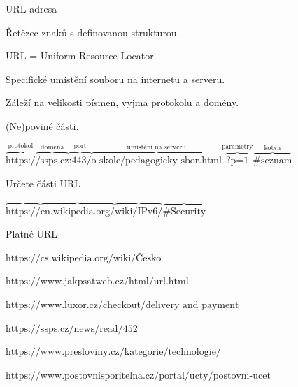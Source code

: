 \documentclass[aspectratio=169]{beamer}
\begin{document}
\begin{frame}{URL adresa}
    \begin{cardTiny}
        \begin{flushleft}
            Řetězec znaků s definovanou strukturou.

            \vspace{2ex}
            URL = Uniform Resource Locator

            Specifické umístění souboru na internetu a serveru.

            Záleží na velikosti písmen, vyjma protokolu a domény.

            (Ne)poviné části.
        \end{flushleft}
    \end{cardTiny}
    \begin{cardTiny}
        \begin{center}
            $ \overbrace{\text{https:/}}^{\text{protokol}}
            \overbrace{\text{/ssps.cz}}^{\text{doména}}
            \overbrace{\text{:443/}}^{\text{port}}
            \overbrace{\text{o-skole/pedagogicky-sbor.html}}^{\text{umístění na serveru}}
            \overbrace{\text{?p=1}}^{\text{parametry}}
            \overbrace{\text{\#seznam}}^{\text{kotva}} $
        \end{center}
    \end{cardTiny}
\end{frame}

\begin{frame}{Určete části URL} 
    \begin{cardTiny}
        \begin{center}
            $ \overbrace{\text{https://}}^{\text{ }}
            \overbrace{\text{en.wikipedia.org/}}^{\text{ }}
            \overbrace{\text{wiki/IPv6/}}^{\text{ }}
            \overbrace{\text{\#Security}}^{\text{ }} $
        \end{center}
    \end{cardTiny}
\end{frame}

\begin{frame}{Platné URL}
    \begin{cardTiny}
        \begin{flushleft}
            $ \text{https://cs.wikipedia.org/wiki/Česko} $

            $ \text{https://www.jakpsatweb.cz/html/url.html} $

            $ \text{https://www.luxor.cz/checkout/delivery\_and\_payment} $

            $ \text{https://ssps.cz/news/read/452} $

            $ \text{https://www.presloviny.cz/kategorie/technologie/} $

            $ \text{https://www.postovnisporitelna.cz/portal/ucty/postovni-ucet} $
        \end{flushleft}
    \end{cardTiny}
\end{frame}
\end{document}
